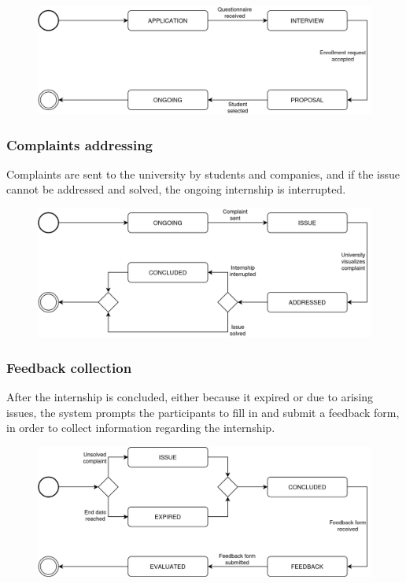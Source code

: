 \begin{figure}[H]
    \centering
    \includegraphics[width=0.8\linewidth]{../assets/state-charts/selection-process.png}
\end{figure}

\subsubsection{Complaints addressing}

Complaints are sent to the university by students and companies, and if the issue cannot be addressed and solved, the ongoing internship is interrupted.

\begin{figure}[H]
    \centering
    \includegraphics[width=0.8\linewidth]{../assets/state-charts/complaints-addressing.png}
\end{figure}

\subsubsection{Feedback collection}

After the internship is concluded, either because it expired or due to arising issues, the system prompts the participants to fill in and submit a feedback form, in order to collect information regarding the internship.

\begin{figure}[H]
    \centering
    \includegraphics[width=0.8\linewidth]{../assets/state-charts/feedback-collection.png}
\end{figure}

